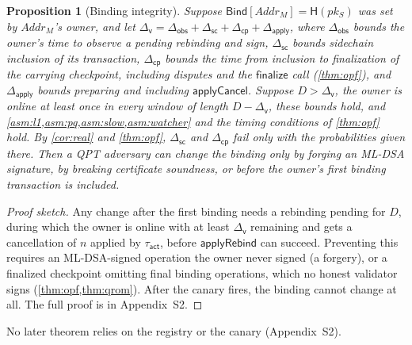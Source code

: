 \documentclass[10pt,journal,compsoc]{IEEEtran}
\theoremstyle{tplain}
\newtheorem{proposition}[theorem]{Proposition}
\theoremstyle{tdef}
\theoremstyle{remark}
\newcommand{\supp}[1]{Appendix~#1}
\newcommand{\Hash}{\mathsf{H}}
\begin{document}
\begin{proposition}[Binding integrity]\label{prop:binding}
Suppose $\mathsf{Bind}[\mathit{Addr}_M]=\Hash(pk_S)$ was set by $\mathit{Addr}_M$'s owner, and let $\Delta_{\mathsf{v}}=\Delta_{\mathsf{obs}}+\Delta_{\mathsf{sc}}+\Delta_{\mathsf{cp}}+\Delta_{\mathsf{apply}}$, where $\Delta_{\mathsf{obs}}$ bounds the owner's time to observe a pending rebinding and sign, $\Delta_{\mathsf{sc}}$ bounds sidechain inclusion of its transaction, $\Delta_{\mathsf{cp}}$ bounds the time from inclusion to finalization of the carrying checkpoint, including disputes and the $\mathsf{finalize}$ call (\cref{thm:opf}), and $\Delta_{\mathsf{apply}}$ bounds preparing and including $\mathsf{applyCancel}$. Suppose $D>\Delta_{\mathsf{v}}$, the owner is online at least once in every window of length $D-\Delta_{\mathsf{v}}$, these bounds hold, and \cref{asm:l1,asm:pq,asm:slow,asm:watcher} and the timing conditions of \cref{thm:opf} hold. By \cref{cor:real} and \cref{thm:opf}, $\Delta_{\mathsf{sc}}$ and $\Delta_{\mathsf{cp}}$ fail only with the probabilities given there. Then a QPT adversary can change the binding only by forging an ML-DSA signature, by breaking certificate soundness, or before the owner's first binding transaction is included.
\end{proposition}
\begin{proof}[Proof sketch]
Any change after the first binding needs a rebinding pending for $D$, during which the owner is online with at least $\Delta_{\mathsf{v}}$ remaining and gets a cancellation of $n$ applied by $\tau_{\mathsf{act}}$, before $\mathsf{applyRebind}$ can succeed. Preventing this requires an ML-DSA-signed operation the owner never signed (a forgery), or a finalized checkpoint omitting final binding operations, which no honest validator signs (\cref{thm:opf,thm:qrom}). After the canary fires, the binding cannot change at all. The full proof is in \supp{S2}.
\end{proof}

\noindent No later theorem relies on the registry or the canary (\supp{S2}).
\end{document}
